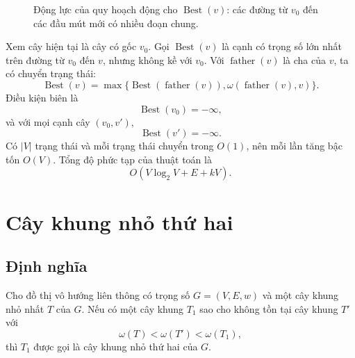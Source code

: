 \documentclass[11pt]{article}
\begin{document}
\begin{figure}[ht]
\centering
{}
\caption{Động lực của quy hoạch động cho $\operatorname{Best}(v)$: các đường
từ $v_0$ đến các đầu mút mới có nhiều đoạn chung.}
\end{figure}

Xem cây hiện tại là cây có gốc $v_0$. Gọi $\operatorname{Best}(v)$ là cạnh có
trọng số lớn nhất trên đường từ $v_0$ đến $v$, nhưng không kề với $v_0$. Với
$\operatorname{father}(v)$ là cha của $v$, ta có chuyển trạng thái:
\[
  \operatorname{Best}(v)=
  \max\{\operatorname{Best}(\operatorname{father}(v)),
        \omega(\operatorname{father}(v),v)\}.
\]
Điều kiện biên là
\[
  \operatorname{Best}(v_0)=-\infty,
\]
và với mọi cạnh cây $(v_0,v')$,
\[
  \operatorname{Best}(v')=-\infty.
\]
Có $|V|$ trạng thái và mỗi trạng thái chuyển trong $O(1)$, nên mỗi lần tăng
bậc tốn $O(V)$. Tổng độ phức tạp của thuật toán là
\[
  O(V\log_2 V+E+kV).
\]

\section{Cây khung nhỏ thứ hai}

\subsection{Định nghĩa}

Cho đồ thị vô hướng liên thông có trọng số $G=(V,E,w)$ và một cây khung nhỏ
nhất $T$ của $G$. Nếu có một cây khung $T_1$ sao cho không tồn tại cây khung
$T'$ với
\[
  \omega(T)<\omega(T')<\omega(T_1),
\]
thì $T_1$ được gọi là cây khung nhỏ thứ hai của $G$.
\end{document}
